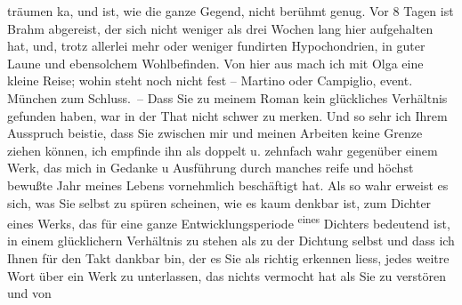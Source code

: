 \begin{ledgroupsized}[t]{13cm}
               träumen ka{\geminationn}, und ist, wie die ganze Gegend, nicht
               berühmt genug. Vor 8 Tagen ist Brahm abgereist,
               der sich nicht weniger als drei Wochen lang hier aufgehalten hat, und, trotz allerlei
               mehr oder weniger fundirten Hypochondrien, in guter Laune und ebensolchem
               Wohlbefinden.\pend
           \pstart
           Von hier aus mach ich mit Olga eine kleine Reise;
               wohin steht noch nicht fest – Martino oder Campiglio, event. München zum Schluss. – Dass Sie zu {\pb}meinem Roman kein glückliches Verhältnis
               gefunden haben, war in der That nicht schwer zu merken. Und so sehr ich Ihrem
               Ausspruch beisti{\geminationm}e, dass Sie zwischen mir und meinen
               Arbeiten keine Grenze ziehen können, ich empfinde ihn als doppelt u. zehnfach wahr
               gegenüber einem Werk, das mich in Gedanke u Ausführung durch manches reife und \introOben{}höchst\introOben{} bewußte Jahr meines Lebens vornehmlich beschäftigt hat.
               Als so wahr erweist es sich, was Sie selbst zu spüren scheinen, wie es kaum denkbar
               ist, zum Dichter eines Werks, das für eine {\pb}ganze
               Entwicklungsperiode \substVorne{}\textsuperscript{eines}\substDazwischen{}\label{T_L01786_1v}\label{T_L01786_1h}\substHinten{} Dichters bedeutend ist, in einem glücklichern Verhältnis zu stehen als zu
               der Dichtung selbst und dass ich Ihnen für den Takt dankbar bin, der es Sie als
               richtig erkennen liess, jedes weitre Wort über ein Werk zu unterlassen, das nichts vermocht hat als Sie zu verstören und von

\end{ledgroupsized}
